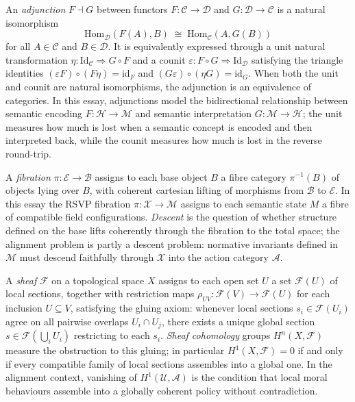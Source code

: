 \documentclass[12pt]{article}
\theoremstyle{definition}
\begin{document}
An \emph{adjunction} $F \dashv G$ between functors $F : \mathcal{C} \to
\mathcal{D}$ and $G : \mathcal{D} \to \mathcal{C}$ is a natural isomorphism
\begin{equation*}
  \mathrm{Hom}_{\mathcal{D}}(F(A), B) \;\cong\; \mathrm{Hom}_{\mathcal{C}}(A, G(B))
\end{equation*}
for all $A \in \mathcal{C}$ and $B \in \mathcal{D}$. It is equivalently
expressed through a unit natural transformation $\eta :
\mathrm{Id}_{\mathcal{C}} \Rightarrow G \circ F$ and a counit $\varepsilon :
F \circ G \Rightarrow \mathrm{Id}_{\mathcal{D}}$ satisfying the triangle
identities $(\varepsilon F) \circ (F \eta) = \mathrm{id}_F$ and
$(G \varepsilon) \circ (\eta G) = \mathrm{id}_G$. When both the unit and
counit are natural isomorphisms, the adjunction is an equivalence of
categories. In this essay, adjunctions model the bidirectional relationship
between semantic encoding $F : \mathcal{H} \to \mathcal{M}$ and semantic
interpretation $G : \mathcal{M} \to \mathcal{H}$; the unit measures how much
is lost when a semantic concept is encoded and then interpreted back, while
the counit measures how much is lost in the reverse round-trip.

A \emph{fibration} $\pi : \mathcal{E} \to \mathcal{B}$ assigns to each base
object $B$ a fibre category $\pi^{-1}(B)$ of objects lying over $B$, with
coherent cartesian lifting of morphisms from $\mathcal{B}$ to $\mathcal{E}$.
In this essay the RSVP fibration $\pi : \mathcal{X} \to \mathcal{M}$ assigns
to each semantic state $M$ a fibre of compatible field configurations.
\emph{Descent} is the question of whether structure defined on the base lifts
coherently through the fibration to the total space; the alignment problem is
partly a descent problem: normative invariants defined in $\mathcal{M}$ must
descend faithfully through $\mathcal{X}$ into the action category $\mathcal{A}$.

A \emph{sheaf} $\mathcal{F}$ on a topological space $X$ assigns to each open
set $U$ a set $\mathcal{F}(U)$ of local sections, together with restriction
maps $\rho_{UV} : \mathcal{F}(V) \to \mathcal{F}(U)$ for each inclusion
$U \subseteq V$, satisfying the gluing axiom: whenever local sections $s_i \in
\mathcal{F}(U_i)$ agree on all pairwise overlaps $U_i \cap U_j$, there exists
a unique global section $s \in \mathcal{F}(\bigcup_i U_i)$ restricting to each
$s_i$. \emph{Sheaf cohomology} groups $H^n(X, \mathcal{F})$ measure the
obstruction to this gluing; in particular $H^1(X, \mathcal{F}) = 0$ if and only
if every compatible family of local sections assembles into a global one. In
the alignment context, vanishing of $H^1(\mathcal{U}, \mathcal{A})$ is the
condition that local moral behaviours assemble into a globally coherent policy
without contradiction.
\end{document}
